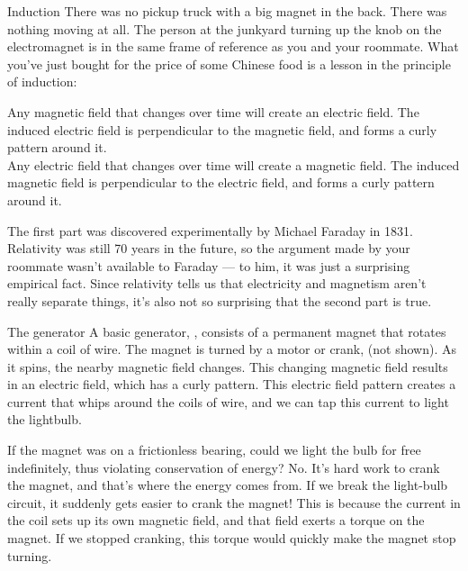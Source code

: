 \begin{envsubsection}{Induction}
There was no pickup truck with a big magnet in the back. There was nothing moving at
all. The person at the junkyard turning up the knob on the electromagnet is in the same
frame of reference as you and your roommate.
What you've just bought for the price of some Chinese food is a lesson in the principle
of induction:

\begin{important}
Any magnetic field that changes over time will create an electric field. The induced
electric field is perpendicular to the magnetic field, and forms a curly pattern around
it.\\
Any electric field that changes over time will create a magnetic field.
The induced
magnetic field is perpendicular to the electric field, and forms a curly pattern around
it.
\end{important}

The first part was discovered experimentally by
Michael Faraday in 1831. Relativity was still 70 years in the future, so the
argument made by your roommate wasn't available to Faraday --- to him, it was just
a surprising empirical fact. Since relativity tells us that electricity and
magnetism aren't really separate things, it's also not so surprising that
the second part is true.

\begin{eg}{The generator}
	A  basic generator, , consists of a permanent magnet that
	rotates within a coil of wire. The magnet is turned by a
	motor or crank, (not shown). As it spins, the nearby
	magnetic field changes. This changing magnetic field results in an
	electric field, which has a curly pattern. This electric
	field pattern creates a current that whips around the coils
	of wire, and we can tap this current to light the lightbulb.
	
	If the magnet was on a frictionless bearing, could we light the bulb
	for free indefinitely, thus violating conservation of energy? No.
	It's hard work to crank the magnet, and that's where
	the energy comes from. If we break the light-bulb circuit, it suddenly
	gets easier to crank the magnet! This is because the current in the coil
	sets up its own magnetic field, and that field exerts a torque on the magnet.
	If we stopped cranking, this torque would quickly make the magnet stop turning.
\end{eg}



\end{envsubsection}

